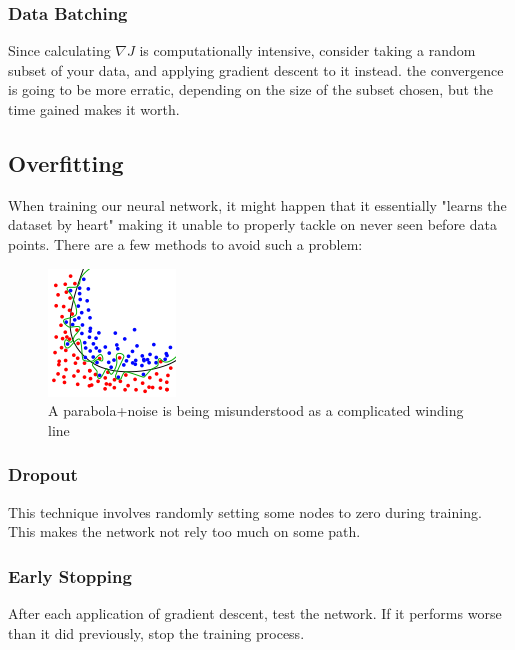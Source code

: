 \documentclass{article}
\begin{document}
	\subsubsection{Data Batching}
	Since calculating $\nabla J$ is computationally intensive, consider taking a random subset of your data, and applying gradient descent to it instead. the convergence is going to be more erratic, depending on the size of the subset chosen, but the time gained makes it worth.
	\subsection{Overfitting}
	When training our neural network, it might happen that it essentially "learns the dataset by heart" making it unable to properly tackle on never seen before data points. There are a few methods to avoid such a problem:
		\begin{figure}[ht!]
		\centering
		\includegraphics{overfitting.png}
		\caption[image of overfitting]{A parabola+noise is being misunderstood as a complicated winding line \protect \footnotemark}
		\end{figure}
	\subsubsection{Dropout}
	This technique involves randomly setting some nodes to zero during training. This makes the network not rely too much on some path.
	\subsubsection{Early Stopping}
	After each application of gradient descent, test the network. If it performs worse than it did previously, stop the training process.	
	
\end{document}
